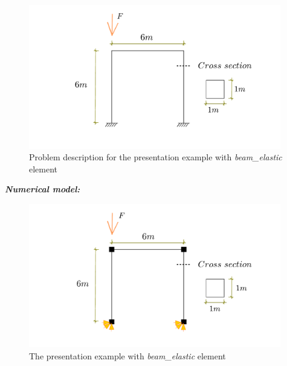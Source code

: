 \documentclass[fleqn,11pt,letter]{article}
\begin{document}
\begin{figure}[H]
  \centering
  \includegraphics[width=11cm]{../Figure_files/beam_elastic/beam_elastic_frame_descrip.pdf}
  \caption{Problem description for the presentation example with \emph{beam\_elastic} element}
\end{figure}


\newpage
\noindent \emph{\textbf{Numerical model:}}



\begin{figure}[H]
  \centering
  \includegraphics[width=11cm]{../Figure_files/beam_elastic/beam_elastic_frame_element.pdf}
  \caption{The presentation example with \emph{beam\_elastic} element}
\end{figure}






\end{document}
